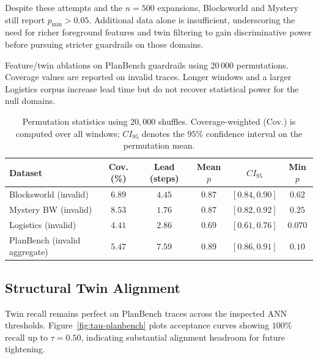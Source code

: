 \documentclass[11pt]{article}
\begin{document}
Despite these attempts and the $n=500$ expansions, Blocksworld and Mystery still report $p_{\min} > 0.05$.
Additional data alone is insufficient, underscoring the need for richer
foreground features and twin filtering to gain discriminative power before
pursuing stricter guardrails on those domains.

\begin{table}[t]
  \centering
  \caption{Feature/twin ablations on PlanBench guardrails using 20\,000 permutations. Coverage values are reported on invalid traces. Longer windows and a larger Logistics corpus increase lead time but do not recover statistical power for the null domains.}
  \label{tab:feature-ablation}
  
\end{table}

\begin{table}[h]
  \centering
  \caption{Permutation statistics using $20{,}000$ shuffles. Coverage-weighted (Cov.) is computed over all windows; $CI_{95}$ denotes the $95\%$ confidence interval on the permutation mean.}
  \label{tab:permutation}
  \begin{tabular}{lccccc}
    \toprule
    Dataset & Cov. (\%) & Lead (steps) & Mean $p$ & $CI_{95}$ & Min $p$ \\
    \midrule
    Blocksworld (invalid) & $6.89$ & $4.45$ & $0.87$ & $[0.84, 0.90]$ & $0.62$ \\
    Mystery BW (invalid) & $8.53$ & $1.76$ & $0.87$ & $[0.82, 0.92]$ & $0.25$ \\
    Logistics (invalid) & $4.41$ & $2.86$ & $0.69$ & $[0.61, 0.76]$ & $0.070$ \\
    PlanBench (invalid aggregate) & $5.47$ & $7.59$ & $0.89$ & $[0.86, 0.91]$ & $0.10$ \\
    \bottomrule
  \end{tabular}
\end{table}

\subsection{Structural Twin Alignment}
Twin recall remains perfect on PlanBench traces across the inspected ANN
thresholds. Figure~\ref{fig:tau-planbench} plots acceptance curves showing $100\%$
recall up to $\tau=0.50$, indicating substantial alignment headroom for future
tightening.
\end{document}
